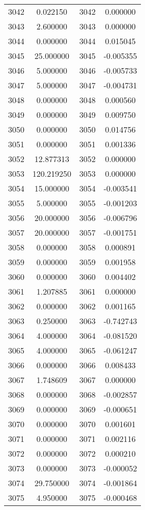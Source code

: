 \documentclass[12pt]{article}
\begin{document}
\begin{longtable}{@{}cccc@{}}
3042 & 0.022150 & 3042 & 0.000000 \\
3043 & 2.600000 & 3043 & 0.000000 \\
3044 & 0.000000 & 3044 & 0.015045 \\
3045 & 25.000000 & 3045 & -0.005355 \\
3046 & 5.000000 & 3046 & -0.005733 \\
3047 & 5.000000 & 3047 & -0.004731 \\
3048 & 0.000000 & 3048 & 0.000560 \\
3049 & 0.000000 & 3049 & 0.009750 \\
3050 & 0.000000 & 3050 & 0.014756 \\
3051 & 0.000000 & 3051 & 0.001336 \\
3052 & 12.877313 & 3052 & 0.000000 \\
3053 & 120.219250 & 3053 & 0.000000 \\
3054 & 15.000000 & 3054 & -0.003541 \\
3055 & 5.000000 & 3055 & -0.001203 \\
3056 & 20.000000 & 3056 & -0.006796 \\
3057 & 20.000000 & 3057 & -0.001751 \\
3058 & 0.000000 & 3058 & 0.000891 \\
3059 & 0.000000 & 3059 & 0.001958 \\
3060 & 0.000000 & 3060 & 0.004402 \\
3061 & 1.207885 & 3061 & 0.000000 \\
3062 & 0.000000 & 3062 & 0.001165 \\
3063 & 0.250000 & 3063 & -0.742743 \\
3064 & 4.000000 & 3064 & -0.081520 \\
3065 & 4.000000 & 3065 & -0.061247 \\
3066 & 0.000000 & 3066 & 0.008433 \\
3067 & 1.748609 & 3067 & 0.000000 \\
3068 & 0.000000 & 3068 & -0.002857 \\
3069 & 0.000000 & 3069 & -0.000651 \\
3070 & 0.000000 & 3070 & 0.001601 \\
3071 & 0.000000 & 3071 & 0.002116 \\
3072 & 0.000000 & 3072 & 0.000210 \\
3073 & 0.000000 & 3073 & -0.000052 \\
3074 & 29.750000 & 3074 & -0.001864 \\
3075 & 4.950000 & 3075 & -0.000468 \\

\end{longtable}
\end{document}
